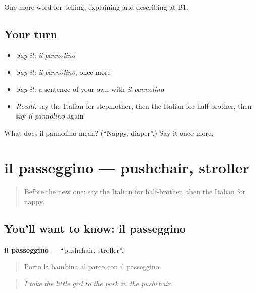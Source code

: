 \begin{grammarlens}[title={What you've built}]
One more word for telling, explaining and describing at B1.
\end{grammarlens}

\subsection*{Your turn}
\begin{itemize}
\raggedright
  \item \emph{Say it:} \emph{il pannolino}
  \item \emph{Say it:} \emph{il pannolino}, once more
  \item \emph{Say it:} a sentence of your own with \emph{il pannolino}
  \item \emph{Recall:} say the Italian for stepmother, then the Italian for half-brother, then say \emph{il pannolino} again
\end{itemize}

\begin{tcolorbox}[breakable,colback=teal!4,colframe=teal!35!black,title={Before you move on}]
What does il pannolino mean? (\textquotedblleft{}Nappy, diaper\textquotedblright{}.) Say it once more.
\end{tcolorbox}
\section[il passeggino]{il passeggino — pushchair, stroller}

\label{lesson:IT-C496-passeggino}



\begin{quote}
Before the new one: say the Italian for half-brother, then the Italian for nappy.
\end{quote}

\subsection*{You'll want to know: il passeggino}
\textbf{il passeggino} — \textquotedblleft{}pushchair, stroller\textquotedblright{}.

\begin{quote}
Porto la bambina al parco con il passeggino.
\end{quote}

\begin{quote}
\emph{I take the little girl to the park in the pushchair.}
\end{quote}

